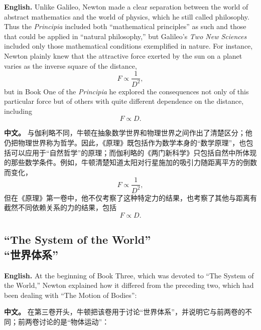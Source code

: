 \noindent\textbf{English.} Unlike Galileo, Newton made a clear separation between the world of abstract mathematics and the world of physics, which he still called philosophy. Thus the \emph{Principia} included both ``mathematical principles'' as such and those that could be applied in ``natural philosophy,'' but Galileo's \emph{Two New Sciences} included only those mathematical conditions exemplified in nature. For instance, Newton plainly knew that the attractive force exerted by the sun on a planet varies as the inverse square of the distance,
\[
F \propto \frac{1}{D^{2}},
\]
but in Book One of the \emph{Principia} he explored the consequences not only of this particular force but of others with quite different dependence on the distance, including
\[
F \propto D.
\]
\par\noindent\textbf{中文。} 与伽利略不同，牛顿在抽象数学世界和物理世界之间作出了清楚区分；他仍把物理世界称为哲学。因此，《原理》既包括作为数学本身的“数学原理”，也包括可以应用于“自然哲学”的原理；而伽利略的《两门新科学》只包括自然中所体现的那些数学条件。例如，牛顿清楚知道太阳对行星施加的吸引力随距离平方的倒数而变化，
\[
F \propto \frac{1}{D^{2}},
\]
但在《原理》第一卷中，他不仅考察了这种特定力的结果，也考察了其他与距离有截然不同依赖关系的力的结果，包括
\[
F \propto D.
\]
\medskip

\subsection*{``The System of the World''\\“世界体系”}

\noindent\textbf{English.} At the beginning of Book Three, which was devoted to ``The System of the World,'' Newton explained how it differed from the preceding two, which had been dealing with ``The Motion of Bodies'':
\par\noindent\textbf{中文。} 在第三卷开头，牛顿把该卷用于讨论“世界体系”，并说明它与前两卷的不同；前两卷讨论的是“物体运动”：
\medskip

